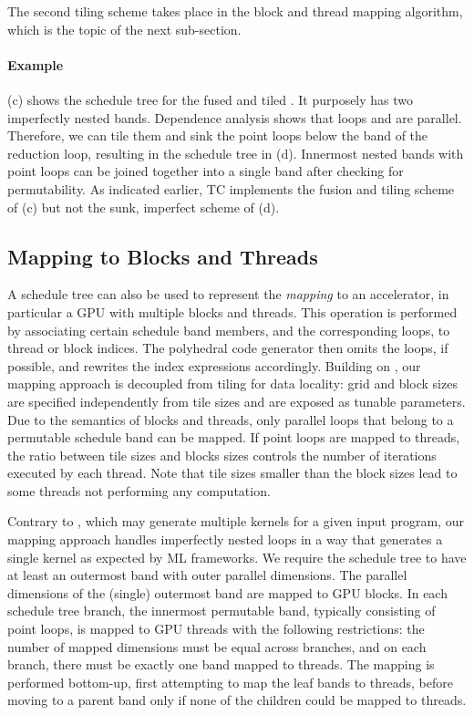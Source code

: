 The second tiling scheme takes place in the block and thread mapping
algorithm, which is the topic of the next sub-section.

\paragraph{Example}
(c) shows the schedule tree for the fused and tiled .
It purposely has two imperfectly nested bands.
Dependence analysis shows that loops  and  are parallel.
Therefore, we can tile them and sink the point loops below the band of the
reduction  loop, resulting in the schedule tree in (d).
Innermost nested bands with point loops can be joined together into a single
band after checking for permutability. As indicated earlier, TC implements the
fusion and tiling scheme of (c) but not the sunk, imperfect scheme
of (d).

\subsection{Mapping to Blocks and Threads}
A schedule tree can also be used to represent the \emph{mapping} to an
accelerator, in particular a GPU with multiple blocks and threads.
This operation is performed by associating certain schedule band members, and
the corresponding loops, to thread or block indices.
The polyhedral code generator then omits the loops, if possible,
and rewrites the
index expressions accordingly.
Building on \ppcg, our mapping approach is decoupled from tiling for data locality: grid and
block sizes are specified independently from tile sizes and are exposed as
tunable parameters.
Due to the semantics of blocks and threads, only parallel loops that belong to a
permutable schedule band can be mapped.
If point loops are mapped to threads, the ratio between tile sizes and blocks
sizes controls the number of iterations executed by each thread.
Note that tile sizes smaller than the block sizes lead to some threads not
performing any computation.

Contrary to \ppcg, which may generate multiple kernels for a given input
program, our mapping approach
handles imperfectly nested loops in a way that generates a single kernel as
expected by ML frameworks.
We require the schedule tree to have at least an outermost band with outer
parallel dimensions.
The parallel dimensions of the (single) outermost band are mapped to GPU
blocks.
In each schedule tree branch, the innermost permutable band, typically
consisting of point loops, is mapped to GPU threads with the following
restrictions: the number of mapped dimensions must be equal across branches,
and on each branch, there must be exactly one band mapped to threads.
The mapping is performed bottom-up, first attempting to map the leaf bands to threads,
before moving to a parent band only if none of the children could be mapped to threads.

